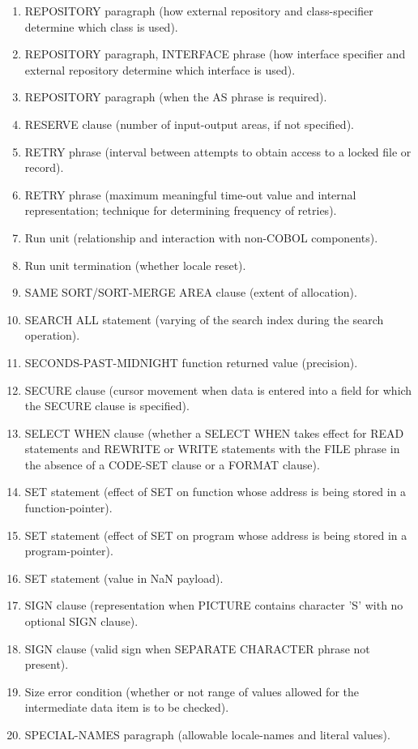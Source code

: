 \begin{enumerate}
\item REPOSITORY paragraph (how external repository and class-specifier determine which class is used).
\item REPOSITORY paragraph, INTERFACE phrase (how interface specifier and external repository determine
  which interface is used).
\item REPOSITORY paragraph (when the AS phrase is required).
\item RESERVE clause (number of input-output areas, if not specified).
\item RETRY phrase (interval between attempts to obtain access to a locked file or record).
\item RETRY phrase (maximum meaningful time-out value and internal representation; technique for determining
  frequency of retries).
\item Run unit (relationship and interaction with non-COBOL components).
\item Run unit termination (whether locale reset).
\item SAME SORT/SORT-MERGE AREA clause (extent of allocation).
\item SEARCH ALL statement (varying of the search index during the search operation).
\item SECONDS-PAST-MIDNIGHT function returned value (precision).
\item SECURE clause (cursor movement when data is entered into a field for which the SECURE clause is specified).
\item SELECT WHEN clause (whether a SELECT WHEN takes effect for READ statements and REWRITE or WRITE
  statements with the FILE phrase in the absence of a CODE-SET clause or a FORMAT clause).
\item SET statement (effect of SET on function whose address is being stored in a function-pointer).
\item SET statement (effect of SET on program whose address is being stored in a program-pointer).
\item SET statement (value in NaN payload).
\item SIGN clause (representation when PICTURE contains character 'S' with no optional SIGN clause).
\item SIGN clause (valid sign when SEPARATE CHARACTER phrase not present).
\item Size error condition (whether or not range of values allowed for the intermediate data item is to be checked).
\item SPECIAL-NAMES paragraph (allowable locale-names and literal values).

\end{enumerate}
